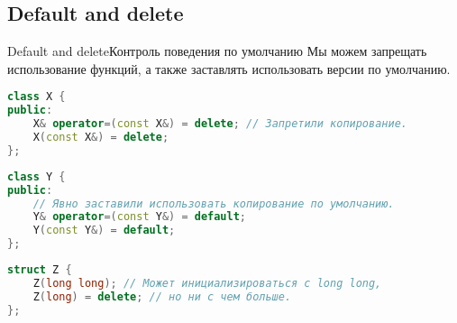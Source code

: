 \documentclass[10pt]{beamer}
\begin{document}
\subsection{Default and delete}
\hypertarget{Default and delete}{}
\begin{frame}[fragile]{Default and delete}{Контроль поведения по умолчанию}
Мы можем запрещать использование функций, а также заставлять использовать версии по умолчанию.
\begin{lstlisting}[language=C++]
class X {
public:
    X& operator=(const X&) = delete; // Запретили копирование.
    X(const X&) = delete;
};
\end{lstlisting}
\begin{lstlisting}[language=C++]
class Y {
public:
    // Явно заставили использовать копирование по умолчанию.
    Y& operator=(const Y&) = default; 
    Y(const Y&) = default;
};
\end{lstlisting}
\begin{lstlisting}[language=C++]
struct Z {
    Z(long long); // Может инициализироваться с long long,
    Z(long) = delete; // но ни с чем больше.
};
\end{lstlisting}
\end{frame}
\end{document}
